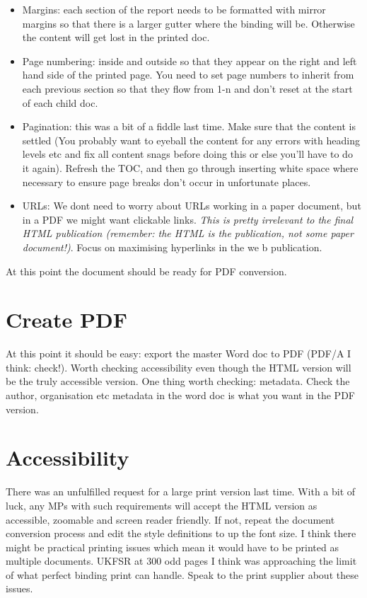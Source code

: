 \documentclass[
]{book}
\providecommand{\tightlist}{%
  \setlength{\itemsep}{0pt}\setlength{\parskip}{0pt}}
\begin{document}
\begin{itemize}
\tightlist
\item
  Margins: each section of the report needs to be formatted with mirror margins so that there is a larger gutter where the binding will be. Otherwise the content will get lost in the printed doc.
\item
  Page numbering: inside and outside so that they appear on the right and left hand side of the printed page. You need to set page numbers to inherit from each previous section so that they flow from 1-n and don't reset at the start of each child doc.
\item
  Pagination: this was a bit of a fiddle last time. Make sure that the content is settled (You probably want to eyeball the content for any errors with heading levels etc and fix all content snags before doing this or else you'll have to do it again). Refresh the TOC, and then go through inserting white space where necessary to ensure page breaks don't occur in unfortunate places.
\item
  URLs: We dont need to worry about URLs working in a paper document, but in a PDF we might want clickable links. \emph{This is pretty irrelevant to the final HTML publication (remember: the HTML is the publication, not some paper document!)}. Focus on maximising hyperlinks in the we b publication.
\end{itemize}

At this point the document should be ready for PDF conversion.

\hypertarget{create-pdf}{%
\section{Create PDF}\label{create-pdf}}

At this point it should be easy: export the master Word doc to PDF (PDF/A I think: check!). Worth checking accessibility even though the HTML version will be the truly accessible version. One thing worth checking: metadata. Check the author, organisation etc metadata in the word doc is what you want in the PDF version.

\hypertarget{accessibility}{%
\section{Accessibility}\label{accessibility}}

There was an unfulfilled request for a large print version last time. With a bit of luck, any MPs with such requirements will accept the HTML version as accessible, zoomable and screen reader friendly. If not, repeat the document conversion process and edit the style definitions to up the font size. I think there might be practical printing issues which mean it would have to be printed as multiple documents. UKFSR at 300 odd pages I think was approaching the limit of what perfect binding print can handle. Speak to the print supplier about these issues.
\end{document}
